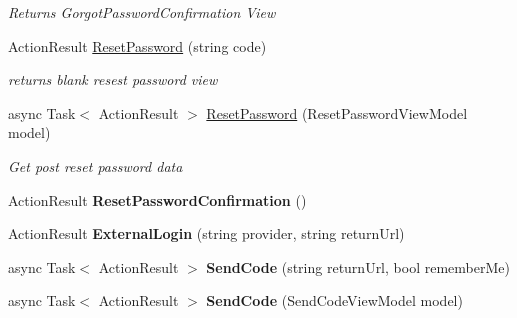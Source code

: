 \begin{DoxyCompactItemize}
\begin{DoxyCompactList}\small\item\em Returns Gorgot\+Password\+Confirmation View \end{DoxyCompactList}\item 
Action\+Result \hyperlink{class_alfa_accounting_1_1_controllers_1_1_account_controller_ae9f8d4a9533cc8e78fa3ed7216f36837}{Reset\+Password} (string code)
\begin{DoxyCompactList}\small\item\em returns blank resest password view \end{DoxyCompactList}\item 
async Task$<$ Action\+Result $>$ \hyperlink{class_alfa_accounting_1_1_controllers_1_1_account_controller_a65a2a1f6a9de8c5c9f458346a9b820e6}{Reset\+Password} (Reset\+Password\+View\+Model model)
\begin{DoxyCompactList}\small\item\em Get post reset password data \end{DoxyCompactList}\item 
\mbox{\label{class_alfa_accounting_1_1_controllers_1_1_account_controller_afcfcfa575bc285843ebb0d1fe67ffcde}} 
Action\+Result {\bfseries Reset\+Password\+Confirmation} ()
\item 
\mbox{\label{class_alfa_accounting_1_1_controllers_1_1_account_controller_acfc74c76545c819bd861bd7651f874d9}} 
Action\+Result {\bfseries External\+Login} (string provider, string return\+Url)
\item 
\mbox{\label{class_alfa_accounting_1_1_controllers_1_1_account_controller_a99f4d6df339b4698d427e9d8ff87a9ce}} 
async Task$<$ Action\+Result $>$ {\bfseries Send\+Code} (string return\+Url, bool remember\+Me)
\item 
\mbox{\label{class_alfa_accounting_1_1_controllers_1_1_account_controller_a56dde3690edce7d9b07efd25237538c8}} 
async Task$<$ Action\+Result $>$ {\bfseries Send\+Code} (Send\+Code\+View\+Model model)
\item 
\mbox{\label{class_alfa_accounting_1_1_controllers_1_1_account_controller_ab37a07ed56c5a029013419b661ef34f4}} 

\end{DoxyCompactItemize}
